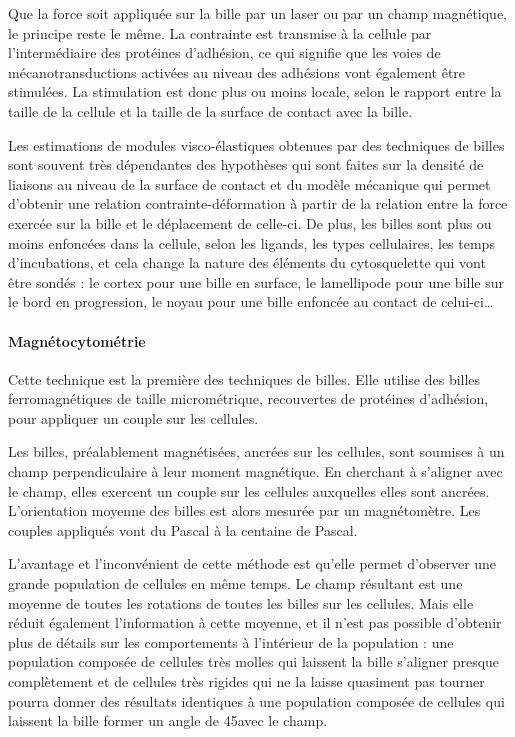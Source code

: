 Que la force soit appliquée sur la bille par un laser ou par un champ magnétique, le principe reste le même. La contrainte est transmise à la cellule par l'intermédiaire des protéines d'adhésion, ce qui signifie que les voies de mécanotransductions activées au niveau des adhésions vont également être stimulées. 
La stimulation est donc plus ou moins locale, selon le rapport entre la taille de la cellule et la taille de la surface de contact avec la bille.

Les estimations de modules visco-élastiques obtenues par des techniques de billes sont souvent très dépendantes des hypothèses qui sont faites sur la densité de liaisons au niveau de la surface de contact et du modèle mécanique qui permet d'obtenir une relation contrainte-déformation à partir de la relation entre la force exercée sur la bille et le déplacement de celle-ci. 
De plus, les billes sont plus ou moins enfoncées dans la cellule, selon les ligands, les types cellulaires, les temps d'incubations, et cela change la nature des éléments du cytosquelette qui vont être sondés : le cortex pour une bille en surface, le lamellipode pour une bille sur le bord en progression, le noyau pour une bille enfoncée au contact de celui-ci\dots


\paragraph{Magnétocytométrie}

Cette technique est la première des techniques de billes. Elle utilise des billes ferromagnétiques de taille micrométrique, recouvertes de protéines d'adhésion, pour appliquer un couple sur les cellules. 

Les billes, préalablement magnétisées, ancrées sur les cellules, sont soumises à un champ perpendiculaire à leur moment magnétique. En cherchant à s'aligner avec le champ, elles exercent un couple sur les cellules auxquelles elles sont ancrées. L'orientation moyenne des billes est alors mesurée par un magnétomètre. Les couples appliqués vont du Pascal à la centaine de Pascal. 

L'avantage et l'inconvénient de cette méthode est qu'elle permet d'observer une grande population de cellules en même temps. Le champ résultant est une moyenne de toutes les rotations de toutes les billes sur les cellules. Mais elle réduit également l'information à cette moyenne, et il n'est pas possible d'obtenir plus de détails sur les comportements à l'intérieur de la population : une population composée de cellules très molles qui laissent la bille s'aligner presque complètement et de cellules très rigides qui ne la laisse quasiment pas tourner pourra donner des résultats identiques à une population composée de cellules qui laissent la bille former un angle de 45\degres avec le champ. 

